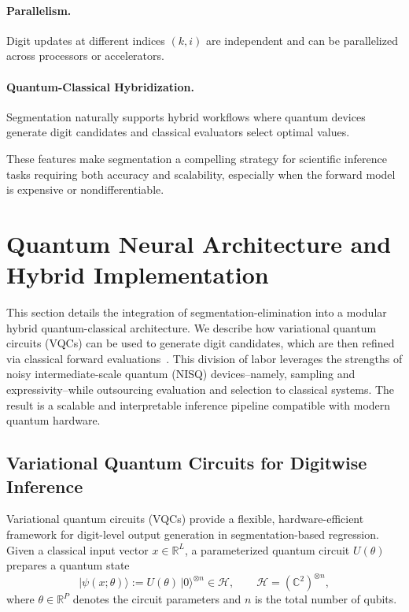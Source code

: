 \documentclass[aps,twocolumn,superscriptaddress,nofootinbib]{revtex4}
\begin{document}
\paragraph{Parallelism.} Digit updates at different indices $(k,i)$ are independent and can be parallelized across processors or accelerators.
\paragraph{Quantum-Classical Hybridization.} Segmentation naturally supports hybrid workflows where quantum devices generate digit candidates and classical evaluators select optimal values.

These features make segmentation a compelling strategy for scientific inference tasks requiring both accuracy and scalability, especially when the forward model is expensive or nondifferentiable.

\section{Quantum Neural Architecture and Hybrid Implementation}
\label{sec:architecture}
This section details the integration of segmentation-elimination into a modular hybrid quantum-classical architecture. We describe how variational quantum circuits (VQCs) can be used to generate digit candidates, which are then refined via classical forward evaluations~\cite{cerezo2021variational}. This division of labor leverages the strengths of noisy intermediate-scale quantum (NISQ) devices--namely, sampling and expressivity--while outsourcing evaluation and selection to classical systems. The result is a scalable and interpretable inference pipeline compatible with modern quantum hardware.%
\subsection{Variational Quantum Circuits for Digitwise Inference}

Variational quantum circuits (VQCs) provide a flexible, hardware-efficient framework for digit-level output generation in segmentation-based regression. Given a classical input vector $x \in \mathbb{R}^L$, a parameterized quantum circuit $U(\theta)$ prepares a quantum state
\begin{equation}
    |\psi(x; \theta)\rangle := U(\theta)\,|0\rangle^{\otimes n} \in \mathcal{H}, \qquad \mathcal{H} = (\mathbb{C}^2)^{\otimes n},
\end{equation}
where $\theta \in \mathbb{R}^P$ denotes the circuit parameters and $n$ is the total number of qubits.
\end{document}
